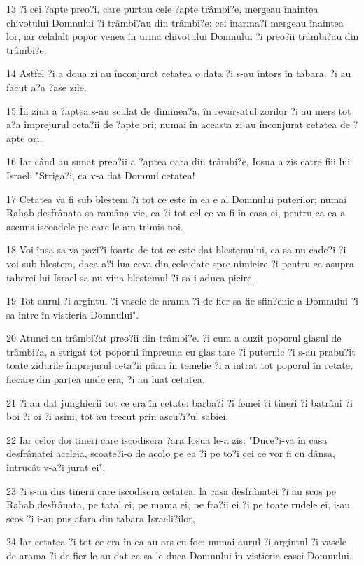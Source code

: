\par 13 ?i cei ?apte preo?i, care purtau cele ?apte trâmbi?e, mergeau înaintea chivotului Domnului ?i trâmbi?au din trâmbi?e; cei înarma?i mergeau înaintea lor, iar celalalt popor venea în urma chivotului Domnului ?i preo?ii trâmbi?au din trâmbi?e.
\par 14 Astfel ?i a doua zi au înconjurat cetatea o data ?i s-au întors în tabara. ?i au facut a?a ?ase zile.
\par 15 În ziua a ?aptea s-au sculat de diminea?a, în revarsatul zorilor ?i au mers tot a?a împrejurul ceta?ii de ?apte ori; numai în aceasta zi au înconjurat cetatea de ?apte ori.
\par 16 Iar când au sunat preo?ii a ?aptea oara din trâmbi?e, Iosua a zis catre fiii lui Israel: "Striga?i, ca v-a dat Domnul cetatea!
\par 17 Cetatea va fi sub blestem ?i tot ce este în ea e al Domnului puterilor; numai Rahab desfrânata sa ramâna vie, ea ?i tot cel ce va fi în casa ei, pentru ca ea a ascuns iscoadele pe care le-am trimis noi.
\par 18 Voi însa sa va pazi?i foarte de tot ce este dat blestemului, ca sa nu cade?i ?i voi sub blestem, daca a?i lua ceva din cele date spre nimicire ?i pentru ca asupra taberei lui Israel sa nu vina blestemul ?i sa-i aduca pieire.
\par 19 Tot aurul ?i argintul ?i vasele de arama ?i de fier sa fie sfin?enie a Domnului ?i sa intre în vistieria Domnului".
\par 20 Atunci au trâmbi?at preo?ii din trâmbi?e. ?i cum a auzit poporul glasul de trâmbi?a, a strigat tot poporul împreuna cu glas tare ?i puternic ?i s-au prabu?it toate zidurile împrejurul ceta?ii pâna în temelie ?i a intrat tot poporul în cetate, fiecare din partea unde era, ?i au luat cetatea.
\par 21 ?i au dat junghierii tot ce era în cetate: barba?i ?i femei ?i tineri ?i batrâni ?i boi ?i oi ?i asini, tot au trecut prin ascu?i?ul sabiei.
\par 22 Iar celor doi tineri care iscodisera ?ara Iosua le-a zis: "Duce?i-va în casa desfrânatei aceleia, scoate?i-o de acolo pe ea ?i pe to?i cei ce vor fi cu dânsa, întrucât v-a?i jurat ei".
\par 23 ?i s-au dus tinerii care iscodisera cetatea, la casa desfrânatei ?i au scos pe Rahab desfrânata, pe tatal ei, pe mama ei, pe fra?ii ei ?i pe toate rudele ei, i-au scos ?i i-au pus afara din tabara Israeli?ilor,
\par 24 Iar cetatea ?i tot ce era în ea au ars cu foc; numai aurul ?i argintul ?i vasele de arama ?i de fier le-au dat ca sa le duca Domnului în vistieria casei Domnului.
